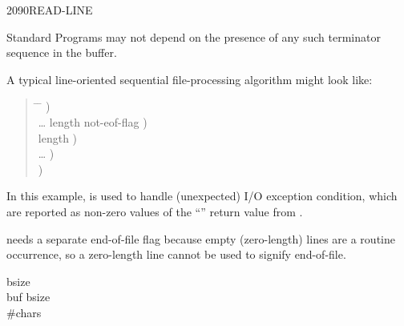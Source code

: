 \begin{worddef}{2090}{READ-LINE}
\begin{rationale}
		Standard Programs may not depend on the presence of any such
		terminator sequence in the buffer.

		A typical line-oriented sequential file-processing algorithm
		might look like:

		\begin{quote}\ttfamily{}
		  \begin{tabbing}
			\tab \= \hspace{12em} \= \kill
							\>\>  ) \\
			\> {\ldots}  
										\>	 \word{p} length not-eof-flag ) \\
			 				\>\>  length ) \\
			\> {\ldots}					\>	  ) \\
			 	\>\>  ) \\
		  \end{tabbing}
		\end{quote}

		In this example,  is used to handle
		(unexpected) I/O exception condition, which are reported as
		non-zero values of the ``'' return value from
		.

		 needs a separate end-of-file flag because
		empty (zero-length) lines are a routine occurrence, so a
		zero-length line cannot be used to signify end-of-file.
	\end{rationale}

	\begin{testing}  bsize \\
		 buf bsize  \\
		 \#chars

		 \\
		 \\
		 \\
		 \\
	\end{testing}
\end{worddef}


